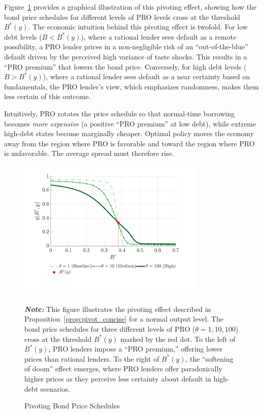 \documentclass[12pt]{article}
\theoremstyle{plain}
\begin{document}
Figure~\ref{fig:pivoting_proof} provides a graphical illustration of this
pivoting effect, showing how the bond price schedules for different levels of
PRO levels cross at the threshold $B^*(y)$. The economic intuition behind this
pivoting effect is twofold. For low debt levels ($B<B^*(y)$), where a rational
lender sees default as a remote possibility, a PRO lender prices in a
non-negligible risk of an ``out-of-the-blue'' default driven by the perceived
high variance of taste shocks. This results in a ``PRO premium'' that lowers
the bond price. Conversely, for high debt levels ($B>B^*(y)$), where a rational
lender sees default as a near certainty based on fundamentals, the PRO lender's
view, which emphasizes randomness, makes them less certain of this outcome.

Intuitively, PRO rotates the price schedule so that normal-time borrowing
becomes \emph{more expensive} (a positive ``PRO premium'' at low debt), while
extreme high-debt states become marginally cheaper. Optimal policy moves the
economy away from the region where PRO is favorable and toward the region where
PRO is unfavorable. The average spread must therefore rise.

\begin{figure}[htb]
	\centering
	\includegraphics[width=0.8\textwidth]{../../pro-default-model/results/comparison_figure_5.pdf}
	\caption{Pivoting Bond Price Schedules}\label{fig:pivoting_proof}

	\parbox{\textwidth}{\small\textit{\textbf{Note:} }This figure illustrates the pivoting effect described in Proposition~\ref{prop:pivot_concise} for a normal output level. The bond price schedules for three different levels of PRO ($\theta = 1, 10, 100$) cross at the threshold $B^*(y)$ marked by the red dot. To the left of $B^*(y)$, PRO lenders impose a ``PRO premium,'' offering lower prices than rational lenders. To the right of $B^*(y)$, the ``softening of doom'' effect emerges, where PRO lenders offer paradoxically higher prices as they perceive less certainty about default in high-debt scenarios.}
\end{figure}
\end{document}
